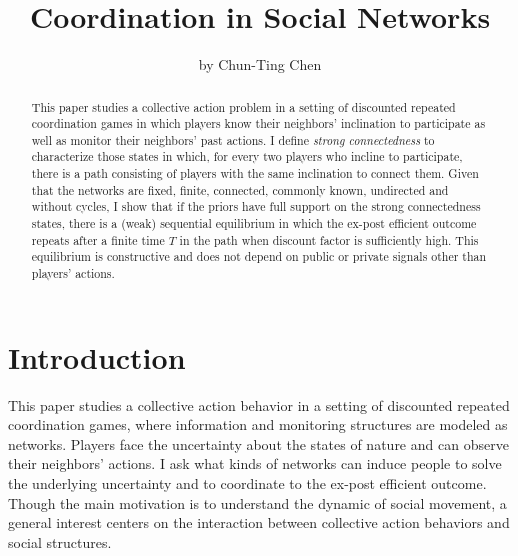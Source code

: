 \documentclass[12pt,letter]{article}
\theoremstyle{definition}
\theoremstyle{remark}
\theoremstyle{claim}
\begin{document}

\title {Coordination in Social Networks}
\author {by Chun-Ting Chen}

\maketitle

\begin{abstract}

This paper studies a collective action problem in a setting of discounted repeated coordination games in which players know their neighbors'  inclination to participate as well as monitor their neighbors' past actions. I define \textit{strong connectedness} to characterize those states in which, for every two players who incline to participate, there is a path consisting of players with the same inclination to connect them.  Given that the networks are fixed, finite, connected, commonly known, undirected and without cycles, I show that if the priors have full support on the strong connectedness states, there is a (weak) sequential equilibrium in which the ex-post efficient outcome repeats after a finite time $T$ in the path when discount factor is sufficiently high. This equilibrium is constructive and does not depend on public or private signals other than players' actions.




\end{abstract}


\section{Introduction} 

This paper studies a collective action behavior in a setting of discounted repeated coordination games, where information and monitoring structures are modeled as networks. Players face the uncertainty about the states of nature and can observe their neighbors' actions. I ask what kinds of networks can induce people to solve the underlying uncertainty and to coordinate to the ex-post efficient outcome. Though the main motivation is to understand the dynamic of social movement, a general interest centers on the interaction between collective action behaviors and social structures.
\end{document}
